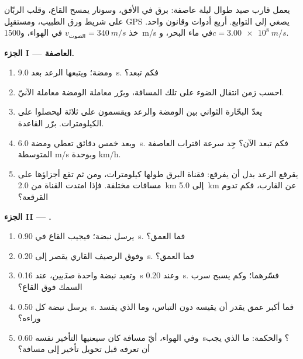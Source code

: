 \begin{problem}[{مسألة نهاية الأسبوع --- قراءة إشارات العالم: قانون
واحد، $d = v\,t$، يقيس بعد عاصفة، ويرسم خريطة قاع، ويعدّ نبض قلب، ويستخرج
كيف يعمل GPS}]
\label{pb:g10:signals-and-waves:1}
يعمل قارب صيد طوال ليلة عاصفة: برق في الأفق،
وسونار يمسح القاع، وقلب الربّان على شريط ورق الطبيب،
ومستقبِل GPS يصغي إلى التوابع. أربع أدوات وقانون
واحد. خذ $v_{\text{الصوت}} = \qty{340}{m/s}$ في الهواء، و\qty{1500}{m/s} في
ماء البحر، و$c = \qty{3.00e8}{m/s}$.

\medskip
\noindent\textbf{الجزء I --- العاصفة.}
\begin{enumerate}
  \item ومضة؛ ويتبعها الرعد بعد \qty{9.0}{s}. فكم تبعد؟
  \item احسب زمن انتقال الضوء على تلك المسافة، وبرّر
        معاملة الومضة معاملة الآنيّ.
  \item يعدّ البحّارة الثواني بين الومضة والرعد ويقسمون
        على ثلاثة ليحصلوا على الكيلومترات. برّر القاعدة.
  \item وبعد خمس دقائق تعطي ومضة \qty{6.0}{s}. فكم تبعد الآن؟
        جِد سرعة اقتراب العاصفة المتوسطة  \unit{m/s} وبوحدة \unit{km/h}.
  \item يقرقع الرعد بدل أن يفرقع: فقناة البرق طولها
        كيلومترات، ومن ثم تقع أجزاؤها على مسافات مختلفة. فإذا امتدت
        القناة من \qty{2.0}{km} إلى \qty{5.0}{km} عن
        القارب، فكم تدوم القرقعة؟
\end{enumerate}

\medskip
\noindent\textbf{الجزء II --- .}
\begin{enumerate}[resume]
  \item يرسل  نبضة؛ فيجيب القاع في \qty{0.90}{s}. فما العمق؟
  \item وفوق الرصيف القاري يقصر  إلى \qty{0.20}{s}. فما العمق؟
  \item وتعيد نبضة واحدة \emph{صدَيين}، عند \qty{0.16}{s} وعند
        \qty{0.20}{s}. فسّرهما؛ وكم يسبح سرب السمك فوق القاع؟
  \item يرسل  نبضة كل \qty{0.50}{s}. فما أكبر عمق
        يقدر أن يقيسه دون التباس، وما الذي يفسد وراءه؟
  \item وفي الهواء، أيّ مسافة كان سيعنيها التأخير نفسه \qty{0.60}{s}؟
        والحكمة: ما الذي يجب أن تعرفه قبل تحويل تأخير إلى
        مسافة؟
\end{enumerate}


\end{problem}
